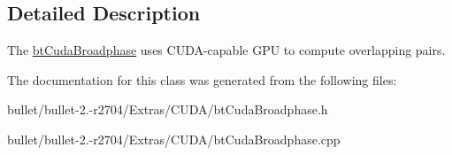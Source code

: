 \subsection{Detailed Description}
The \hyperlink{classbt_cuda_broadphase}{bt\+Cuda\+Broadphase} uses C\+U\+D\+A-\/capable G\+P\+U to compute overlapping pairs. 

The documentation for this class was generated from the following files\+:\begin{DoxyCompactItemize}
\item 
bullet/bullet-\/2.-\/r2704/\+Extras/\+C\+U\+D\+A/bt\+Cuda\+Broadphase.\+h\item 
bullet/bullet-\/2.-\/r2704/\+Extras/\+C\+U\+D\+A/bt\+Cuda\+Broadphase.\+cpp\end{DoxyCompactItemize}
